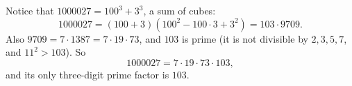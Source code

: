 Notice that $1000027=100^3+3^3$, a sum of cubes:
\[
1000027=(100+3)\left(100^2-100\cdot3+3^2\right)=103\cdot9709 .
\]
Also $9709=7\cdot1387=7\cdot19\cdot73$, and $103$ is prime (it is not divisible by $2,3,5,7$, and $11^2>103$). So
\[
1000027=7\cdot19\cdot73\cdot103,
\]
and its only three-digit prime factor is $\boxed{103}$.
